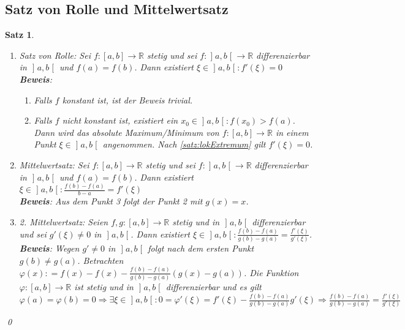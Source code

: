 \documentclass[ngerman,titlepage,twoside, parskip=half*]{scrreprt}
\newcommand*{\R}{\mathbb{R}}
\theoremstyle{plain}
\newtheorem{theorem}{Satz}[section]
\theoremstyle{definition}
\theoremstyle{remark}
\newcommand*{\coloneqq}{\mathrel{\mathop:}=}
\newcommand*{\bsofint}[1]{\mathopen{]}#1\mathclose{[}} %
\begin{document}
\subsection{Satz von Rolle und Mittelwertsatz}
\begin{theorem}
  \begin{enumerate}[(1)]
    \item Satz von Rolle: Sei $f\colon[a,b]\rightarrow\R$ stetig und sei $f\colon
      \bsofint{a,b}\rightarrow\R$ differenzierbar in $\bsofint{a,b}$ und $f(a)=f(b)$.
      Dann existiert $\xi\in \bsofint{a,b}\colon f'(\xi)=0$\\
      \textbf{Beweis}:\begin{enumerate}[1. F{a}ll]
	\item Falls $f$ konstant ist, ist der Beweis trivial.
	\item Falls $f$ nicht konstant ist, existiert ein $x_0\in
	  \bsofint{a,b}\colon f(x_0)>f(a)$. Dann wird das absolute Maximum/Minimum von
	  $f\colon[a,b]\rightarrow\R$ in einem Punkt $\xi\in\bsofint{a,b}$
	  angenommen. Nach \autoref{satz:lokExtremum} gilt $f'(\xi)=0$.
      \end{enumerate}
    \item Mittelwertsatz: Sei $f\colon[a,b]\rightarrow\R$ stetig und sei $f\colon
      \bsofint{a,b}\rightarrow\R$ differenzierbar in $\bsofint{a,b}$ und $f(a)=f(b)$. Dann
      existiert $\xi\in\bsofint{a,b}\colon\frac{f(b)-f(a)}{b-a}=f'(\xi)$\\
      \textbf{Beweis}: Aus dem Punkt 3 folgt der Punkt 2 mit $g(x)=x$.
    \item 2. Mittelwertsatz: Seien $f,g\colon[a,b]\rightarrow\R$ stetig und 
      in $\bsofint{a,b}$ differenzierbar und sei $g'(\xi)\neq 0$ in $\bsofint{a,b}$. 
      Dann existiert $\xi\in\bsofint{a,b}\colon\frac{f(b)-f(a)}{g(b)-g(a)}=
      \frac{f'(\xi)}{g'(\xi)}$.\\
      \textbf{Beweis}: Wegen $g'\neq 0$ in $\bsofint{a,b}$ folgt nach dem 
      ersten Punkt $g(b)\neq g(a)$. Betrachten $\varphi(x)\coloneqq f(x)-f(x)-
      \frac{f(b)-f(a)}{g(b)-g(a)}(g(x)-g(a))$. Die Funktion $\varphi\colon
      [a,b]\rightarrow\R$ ist stetig und in $\bsofint{a,b}$ differenzierbar und
      es gilt $\varphi (a)=\varphi(b)=0\Rightarrow \exists\xi\in\bsofint{a,b}\colon
      0=\varphi'(\xi)=f'(\xi)-\frac{f(b)-f(a)}{g(b)-g(a)}g'(\xi)
      \Rightarrow \frac{f(b)-f(a)}{g(b)-g(a)}=\frac{f'(\xi)}{g'(\xi)}$
  \end{enumerate}
  \qed
\end{theorem}
\end{document}
